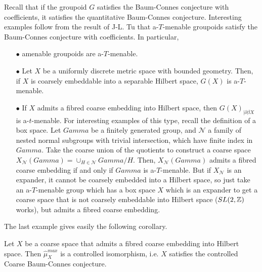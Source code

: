 Recall that if the groupoid $G$ satisfies the Baum-Connes conjecture with coefficients, it satisfies the quantitative Baum-Connes conjecture. Interesting examples follow from the result of J-L. Tu \cite{TuThese} that a-$T$-menable groupoids satisfy the Baum-Connes conjecture with coefficients. In particular, \\

\begin{itemize}
\item[$\bullet$] amenable groupoids are a-$T$-menable.\\
\item[$\bullet$] Let $X$ be a uniformly discrete metric space with bounded geometry. Then, if $X$ is coarsely embeddable into a separable Hilbert space, $G(X)$ is a-$T$-menable.\cite{SkTuYu} \\
\item[$\bullet$] If $X$ admits a fibred coarse embedding into Hilbert space, then $G(X)_{|\partial \beta X}$ is a-$t$-menable.\cite{FinnSellFibred} For interesting examples of this type, recall the definition of a box space. Let $Gamma$ be a finitely generated group, and $\mathcal N$ a family of nested normal subgroups with trivial intersection, which have finite index in $Gamma$. Take the coarse union of the quotients to construct a coarse space $X_{\mathcal N}(Gamma)= \cup_{H\in \mathcal N } Gamma/ H$. Then, $X_{\mathcal N}(Gamma)$ admits a fibred coarse embedding if and only if $Gamma$ is a-$T$-menable. But if $X_{\mathcal N}$ is an expander, it cannot be coarsely embedded into a Hilbert space, so just take an a-$T$-menable group which has a box space $X$ which is an expander to get a coarse space that is not coarsely embeddable into Hilbert space ($SL(2,\mathbb Z)$ works), but admits a fibred coarse embedding.\\
\end{itemize}

The last example gives easily the following corollary.

\begin{cor}
Let $X$ be a coarse space that admits a fibred coarse embedding into Hilbert space. Then $\hat \mu_{X}^{max}$ is a controlled isomorphism, i.e. $X$ satisfies the controlled Coarse Baum-Connes conjecture.
\end{cor}

